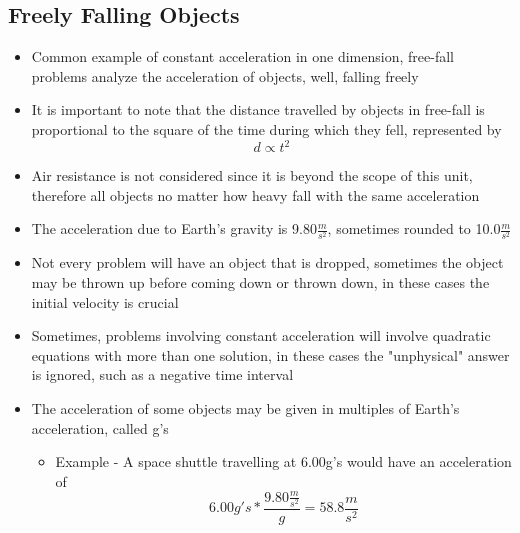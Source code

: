 \subsection{Freely Falling Objects}
\begin{itemize}
    \item Common example of constant acceleration in one dimension, free-fall problems analyze the acceleration of objects, well, falling freely
    \item It is important to note that the distance travelled by objects in free-fall is proportional to the square of the time during which they fell, represented by \[d\propto t^2\]
    \item Air resistance is not considered since it is beyond the scope of this unit, therefore all objects no matter how heavy fall with the same acceleration
    \item The acceleration due to Earth's gravity is 9.80$\frac{m}{s^2}$, sometimes rounded to 10.0$\frac{m}{s^2}$
    \item Not every problem will have an object that is dropped, sometimes the object may be thrown up before coming down or thrown down, in these cases the initial velocity is crucial
    \item Sometimes, problems involving constant acceleration will involve quadratic equations with more than one solution, in these cases the "unphysical" answer is ignored, such as a negative time interval
    \item The acceleration of some objects may be given in multiples of Earth's acceleration, called g's
    \begin{itemize}
        \item Example - A space shuttle travelling at 6.00g's would have an acceleration of \[6.00g's*\frac{9.80\frac{m}{s^2}}{g}=58.8\frac{m}{s^2}\]
    \end{itemize}
\end{itemize}

